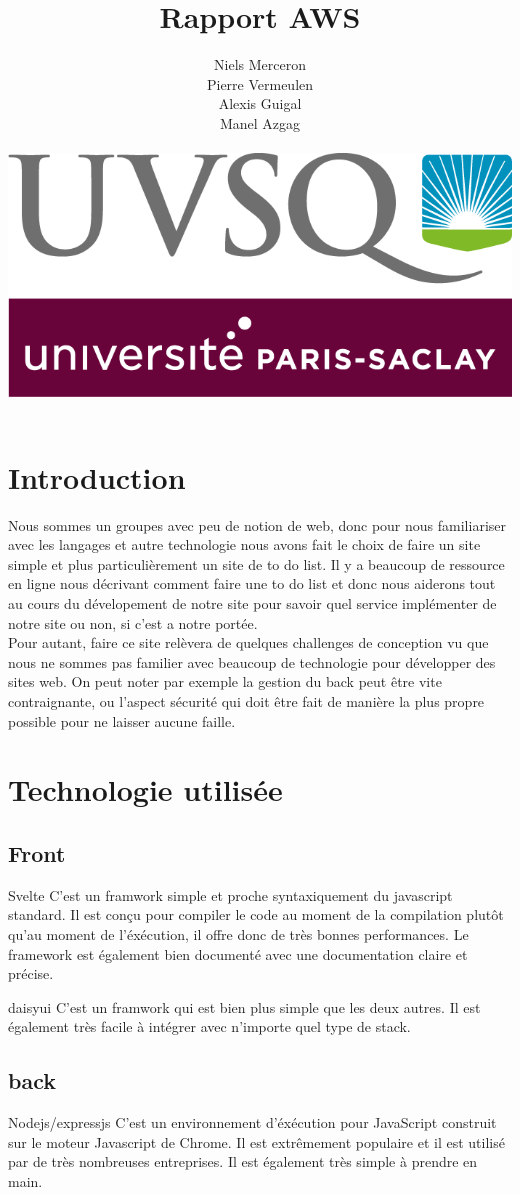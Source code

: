 \documentclass[a4paper,12pt]{report}
\date{}
\title{Rapport AWS }
\author{Niels Merceron \\ Pierre Vermeulen \\ Alexis Guigal \\ Manel Azgag \\ \\  \includegraphics[scale=0.20]{logo-UVSQ-2020-RVB.png}}
\begin{document}
	\maketitle
	
	\newpage
	 \tableofcontents
		\chapter{Introduction}
		
			Nous sommes un groupes avec peu de notion de web, donc pour nous familiariser avec les langages et autre technologie nous avons fait le choix de faire un site  simple et plus particulièrement un site de to do list. Il y a beaucoup de ressource en ligne nous décrivant comment faire une to do list et donc nous aiderons tout au cours du dévelopement de notre site pour savoir quel service implémenter de notre site ou non, si c'est a notre portée.
			\\Pour autant, faire ce site relèvera de quelques challenges de conception vu que nous ne sommes pas familier avec beaucoup de technologie pour développer des sites web.
			On peut noter par exemple la gestion du back peut être vite contraignante, ou l'aspect sécurité qui doit être fait de manière la plus propre possible pour ne laisser aucune faille.
			
  
		\chapter{Technologie utilisée}
			\section{Front}
			
			Svelte
				  C'est un framwork simple et proche syntaxiquement du javascript standard. Il est conçu pour compiler le code au moment de la compilation plutôt qu'au moment de l'éxécution, il offre donc de très bonnes performances. Le framework est également bien documenté avec une documentation claire et précise.
				
				daisyui  
				  C'est un framwork qui est bien plus simple que les deux autres. Il est également très facile à intégrer avec n'importe quel type de stack.
			\section{back}
			
			Nodejs/expressjs
			C'est un environnement d'éxécution pour JavaScript construit sur le moteur Javascript de Chrome. Il est extrêmement populaire et il est utilisé par de très nombreuses entreprises. Il est également très simple à prendre en main. 
			
\end{document}
